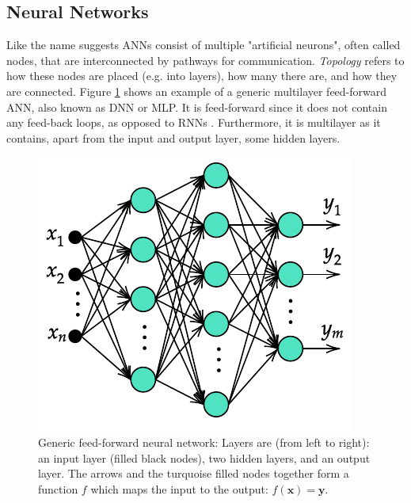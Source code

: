 \documentclass[../main.tex]{subfiles}
\begin{document}
\subsection{Neural Networks}
\label{sec:A-NeuralNetworks}
Like the name suggests \acp{ANN} consist of multiple "artificial neurons", often called nodes, that are interconnected by pathways for communication.
\textit{Topology} refers to how these nodes are placed (e.g. into layers), how many there are, and how they are connected.
Figure \ref{fig:generic-ann} shows an example of a generic multilayer feed-forward \ac{ANN}, also known as \ac{DNN} or \ac{MLP}.
It is feed-forward since it does not contain any feed-back loops, as opposed to \acp{RNN} \cite{Goodfellow2016, Haykin2009}. Furthermore, it is multilayer as it contains, apart from the input and output layer, some hidden layers.

\begin{figure}[ht]
    \centering
    \includegraphics{img/generic-ann-diagram}
    \caption{Generic feed-forward neural network: Layers are (from left to right): an input layer (filled black nodes), two hidden layers, and an output layer. The arrows and the turquoise filled nodes together form a function $f$ which maps the input to the output: $f(\mathbf{x})=\mathbf{y} $.}
    \label{fig:generic-ann}
\end{figure}
\end{document}
